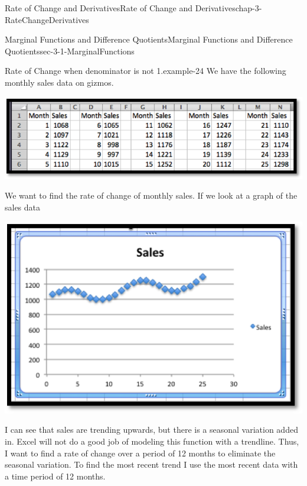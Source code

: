 \documentclass[oneside,10pt,]{book}
\numberwithin{equation}{section}
\begin{document}
\begin{chapterptx}{Rate of Change and Derivatives}{}{Rate of Change and Derivatives}{}{}{chap-3-RateChangeDerivatives}
\begin{sectionptx}{Marginal Functions and Difference Quotients}{}{Marginal Functions and Difference Quotients}{}{}{sec-3-1-MarginalFunctions}
\begin{example}{Rate of Change when denominator is not 1.}{example-24}%
\hypertarget{p-933}{}%
We have the following monthly sales data on gizmos.%
\begin{sidebyside}{1}{0.1}{0.1}{0}%
\begin{sbspanel}{0.8}%
\includegraphics[width=1\linewidth]{images/sec3-1-10.png}
\end{sbspanel}%
\end{sidebyside}%
\par
\hypertarget{p-934}{}%
We want to find the rate of change of monthly sales. If we look at a graph of the sales data%
\begin{sidebyside}{1}{0.2}{0.2}{0}%
\begin{sbspanel}{0.6}%
\includegraphics[width=1\linewidth]{images/sec3-1-11.png}
\end{sbspanel}%
\end{sidebyside}%
\par
\hypertarget{p-935}{}%
I can see that sales are trending upwards, but there is a seasonal variation added in.  Excel will not do a good job of modeling this function with a trendline.  Thus, I want to find a rate of change over a period of 12 months to eliminate the seasonal variation.  To find the most recent trend I use the most recent data with a time period of 12 months.%

\end{example}
\end{sectionptx}
\end{chapterptx}
\end{document}
